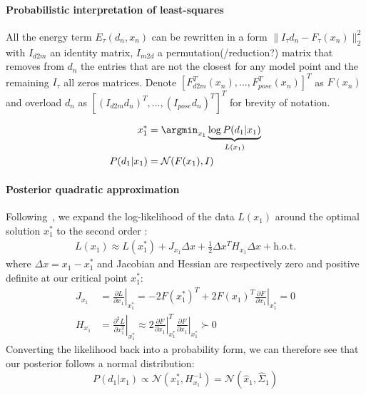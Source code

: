 \paragraph{Probabilistic interpretation of least-squares}
\begin{DRAFT}
All the energy term $E_{\tau}(d_n, x_n)$ can be rewritten in a form $\|I_{\tau} d_n - F_{\tau} (x_n)\|_2^2$ with $I_{d2m}$ an identity matrix, $I_{m2d}$ a permutation(/reduction?) matrix that removes from $d_n$ the entries that are not the closest for any model point and the remaining $I_{\tau}$ all zeros matrices. 
Denote $\left[F_{d2m}^T(x_n), ..., F_{pose}^T(x_n)\right]^T$ as $F(x_n)$ and overload $d_n$ as  $\left[(I_{d2m} d_n)^T, ..., (I_{pose} d_n)^T\right]^T$  for brevity of notation.
\end{DRAFT}
% 
\begin{align}
x^*_1 &= \argmin_{x_1} \underbrace{\log  P(d_1|x_1)}_{L(x_1)} 
\\
P(d_1|x_1) &= \mathcal{N}(F(x_1), I) 
\label{eq:independent}
\end{align}
% 

\paragraph{Posterior quadratic approximation} 
\label{sec:posterior}
% 
Following~\todo{[??]}, we expand the log-likelihood of the data $L(x_1)$ around the optimal solution $x_1^*$ to the second order :
% 
\begin{align}
L(x_1) \approx L(x_1^*)   
+ J_{x_1} \Delta x
+ \tfrac{1}{2} \Delta x^T H_{x_1} \Delta x 
+ \text{h.o.t.}
\end{align}
%
where $\Delta x=x_1 - x_1^*$ and Jacobian and Hessian are respectively zero and positive definite at our critical point $x_1^*$:
\begin{align*}
J_{x_1} &= 
\left.\tfrac{\partial L}{\partial x_1} \right|_{x_1^*} = - 2 F(x_1^*)^T + 2 F(x_1)^T 
\left.\tfrac{\partial F}{\partial x_1}\right|_{x_1^*} = 0
\\
H_{x_1} &= 
\left.\tfrac{\partial^2 L}{\partial x_1^2}\right|_{x_1^*} 
\approx 2
\left.\tfrac{\partial F}{\partial x_1}\right|_{x_1^*}^T  
\left.\tfrac{\partial F}{\partial x_1}\right|_{x_1^*}
\succ 0
\end{align*}
% 
Converting the likelihood back into a probability form, we can therefore see that our posterior follows a normal distribution:
% 
\begin{equation}
P(d_1|x_1) 
\propto \mathcal{N}(x_1^*, H_{x_1}^{-1}) 
= \mathcal{N}(\hat x_1, \hat \Sigma_1)
\end{equation}

